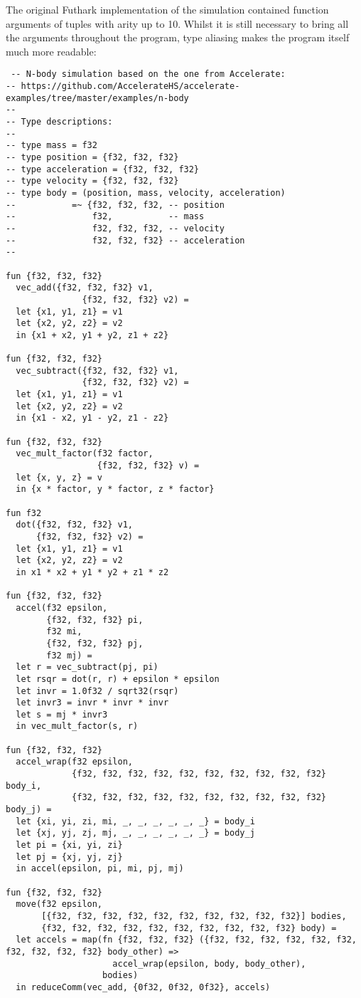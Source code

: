The original Futhark implementation of the simulation contained function
arguments of tuples with arity up to 10. Whilst it is still necessary to bring
all the arguments throughout the program, type aliasing makes the program itself
much more readable:
\begin{lstlisting}
 -- N-body simulation based on the one from Accelerate:
-- https://github.com/AccelerateHS/accelerate-examples/tree/master/examples/n-body
--
-- Type descriptions:
--
-- type mass = f32
-- type position = {f32, f32, f32}
-- type acceleration = {f32, f32, f32}
-- type velocity = {f32, f32, f32}
-- type body = (position, mass, velocity, acceleration)
--           =~ {f32, f32, f32, -- position
--               f32,           -- mass
--               f32, f32, f32, -- velocity
--               f32, f32, f32} -- acceleration
--

fun {f32, f32, f32}
  vec_add({f32, f32, f32} v1,
               {f32, f32, f32} v2) =
  let {x1, y1, z1} = v1
  let {x2, y2, z2} = v2
  in {x1 + x2, y1 + y2, z1 + z2}

fun {f32, f32, f32}
  vec_subtract({f32, f32, f32} v1,
               {f32, f32, f32} v2) =
  let {x1, y1, z1} = v1
  let {x2, y2, z2} = v2
  in {x1 - x2, y1 - y2, z1 - z2}

fun {f32, f32, f32}
  vec_mult_factor(f32 factor,
                  {f32, f32, f32} v) =
  let {x, y, z} = v
  in {x * factor, y * factor, z * factor}

fun f32
  dot({f32, f32, f32} v1,
      {f32, f32, f32} v2) =
  let {x1, y1, z1} = v1
  let {x2, y2, z2} = v2
  in x1 * x2 + y1 * y2 + z1 * z2
  
fun {f32, f32, f32}
  accel(f32 epsilon,
        {f32, f32, f32} pi,
        f32 mi,
        {f32, f32, f32} pj,
        f32 mj) =
  let r = vec_subtract(pj, pi)
  let rsqr = dot(r, r) + epsilon * epsilon
  let invr = 1.0f32 / sqrt32(rsqr)
  let invr3 = invr * invr * invr
  let s = mj * invr3
  in vec_mult_factor(s, r)

fun {f32, f32, f32}
  accel_wrap(f32 epsilon,
             {f32, f32, f32, f32, f32, f32, f32, f32, f32, f32} body_i,
             {f32, f32, f32, f32, f32, f32, f32, f32, f32, f32} body_j) =
  let {xi, yi, zi, mi, _, _, _, _, _, _} = body_i
  let {xj, yj, zj, mj, _, _, _, _, _, _} = body_j
  let pi = {xi, yi, zi}
  let pj = {xj, yj, zj}
  in accel(epsilon, pi, mi, pj, mj)
  
fun {f32, f32, f32}
  move(f32 epsilon,
       [{f32, f32, f32, f32, f32, f32, f32, f32, f32, f32}] bodies,
       {f32, f32, f32, f32, f32, f32, f32, f32, f32, f32} body) =
  let accels = map(fn {f32, f32, f32} ({f32, f32, f32, f32, f32, f32, f32, f32, f32, f32} body_other) =>
                     accel_wrap(epsilon, body, body_other),
                   bodies)
  in reduceComm(vec_add, {0f32, 0f32, 0f32}, accels)


\end{lstlisting}
